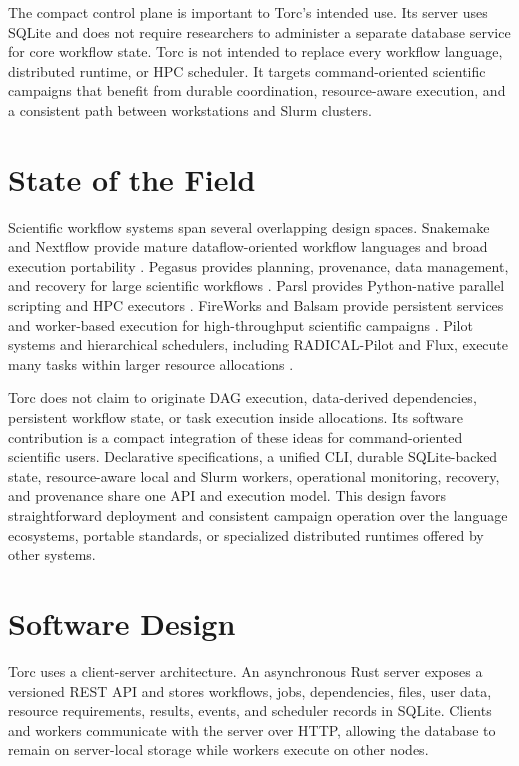 \documentclass[11pt]{article}
\begin{document}
The compact control plane is important to Torc's intended use. Its server uses SQLite and does not
require researchers to administer a separate database service for core workflow state. Torc is not
intended to replace every workflow language, distributed runtime, or HPC scheduler. It targets
command-oriented scientific campaigns that benefit from durable coordination, resource-aware
execution, and a consistent path between workstations and Slurm clusters.

\section{State of the Field}

Scientific workflow systems span several overlapping design spaces. Snakemake and Nextflow provide
mature dataflow-oriented workflow languages and broad execution portability
\citep{molder2021snakemake,ditommaso2017nextflow}. Pegasus provides planning, provenance, data
management, and recovery for large scientific workflows \citep{deelman2019pegasus}. Parsl provides
Python-native parallel scripting and HPC executors \citep{babuji2019parsl}. FireWorks and Balsam
provide persistent services and worker-based execution for high-throughput scientific campaigns
\citep{jain2015fireworks,salim2018balsam}. Pilot systems and hierarchical schedulers, including
RADICAL-Pilot and Flux, execute many tasks within larger resource allocations
\citep{merzky2018radicalpilot,ahn2020flux}.

Torc does not claim to originate DAG execution, data-derived dependencies, persistent workflow
state, or task execution inside allocations. Its software contribution is a compact integration of
these ideas for command-oriented scientific users. Declarative specifications, a unified CLI,
durable SQLite-backed state, resource-aware local and Slurm workers, operational monitoring,
recovery, and provenance share one API and execution model. This design favors straightforward
deployment and consistent campaign operation over the language ecosystems, portable standards, or
specialized distributed runtimes offered by other systems.

\section{Software Design}

Torc uses a client-server architecture. An asynchronous Rust server exposes a versioned REST API and
stores workflows, jobs, dependencies, files, user data, resource requirements, results, events, and
scheduler records in SQLite. Clients and workers communicate with the server over HTTP, allowing the
database to remain on server-local storage while workers execute on other nodes.
\end{document}
